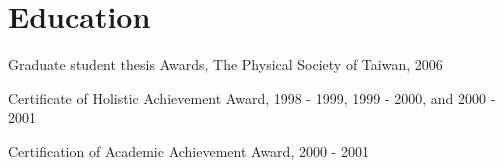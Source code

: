 \documentclass[letterpaper]{deedy-resume-openfont}
\begin{document}

\section{Education} 

\begin{tightemize}
\item \href{https://hdl.handle.net/11244/299774}{\color{link}{Dissertation link}}
\end{tightemize}
\sectionsep

\begin{tightemize}
\item \href{http://www.airitilibrary.com/Publication/alDetailedMesh1?DocID=U0001-1407200616551200}{\color{link}{Thesis link}}
\item Graduate student thesis Awards, The Physical Society of Taiwan, 2006
\end{tightemize}
\sectionsep

\begin{tightemize}
\item Certificate of Holistic Achievement Award, 1998 - 1999, 1999 - 2000, and 2000 - 2001
\item Certification of Academic Achievement Award, 2000 - 2001
\end{tightemize}
\sectionsep

\end{document}
